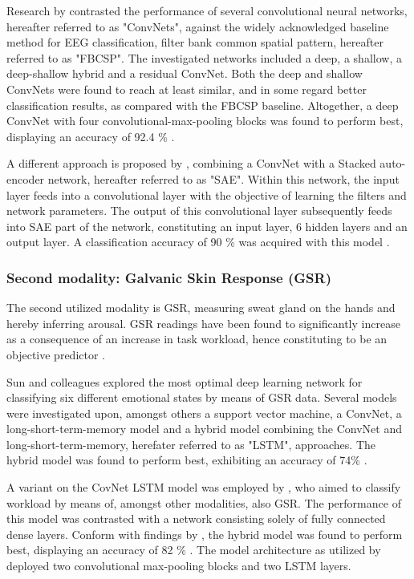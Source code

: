 \documentclass[12pt]{article}
\begin{document}
Research by  contrasted the performance of several convolutional neural networks, hereafter referred to as "ConvNets", against the widely acknowledged baseline method for EEG classification, filter bank common spatial pattern, hereafter referred to as "FBCSP". The investigated networks included a deep, a shallow, a deep-shallow hybrid and a residual ConvNet. Both the deep and shallow ConvNets were found to reach at least similar, and in some regard better classification results, as compared with the FBCSP baseline. Altogether, a deep ConvNet with four convolutional-max-pooling blocks was found to perform best, displaying an accuracy of 92.4 \% \cite{schirrmeister2017deep}.

A different approach is proposed by , combining a ConvNet with a Stacked auto-encoder network, hereafter referred to as "SAE". Within this network, the input layer feeds into a convolutional layer with the objective of learning the filters and network parameters. The output of this convolutional layer subsequently feeds into SAE part of the network, constituting an input layer, 6 hidden layers and an output layer. A classification accuracy of 90 \% was acquired with this model \cite{tabar2016novel} . 

\subsubsection{Second modality: Galvanic Skin Response (GSR)}
The second utilized modality is GSR, measuring sweat gland on the hands and hereby inferring arousal. GSR readings have been found to significantly increase as a consequence of an increase in task workload, hence constituting to be an objective predictor \cite{shi2007galvanic}. 

Sun and colleagues explored the most optimal deep learning network for classifying six different emotional states by means of GSR data. Several models were investigated upon, amongst others a support vector machine, a ConvNet, a long-short-term-memory model and a hybrid model combining the ConvNet and long-short-term-memory, herefater referred to as "LSTM", approaches. The hybrid model was found to perform best, exhibiting an accuracy of 74\% \cite{sun2019hybrid}. 

A variant on the CovNet LSTM model was employed by , who aimed to classify workload by means of, amongst other modalities, also GSR. The performance of this model was contrasted with a network consisting solely of fully connected dense layers. Conform with findings by  , the hybrid model was found to perform best, displaying an accuracy of 82 \% \cite{dolmans2020perceived}. The model architecture as utilized by  deployed two convolutional max-pooling blocks and two LSTM layers.
\end{document}
